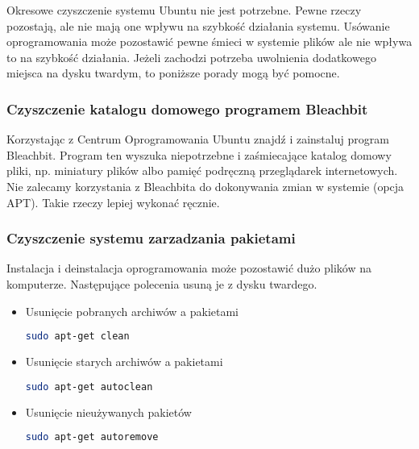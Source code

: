 Okresowe czyszczenie systemu Ubuntu nie jest potrzebne. Pewne rzeczy pozostają, ale nie mają one wpływu na szybkość działania systemu. Usówanie oprogramowania może pozostawić pewne śmieci w systemie plików ale nie wpływa to na szybkość działania. Jeżeli zachodzi potrzeba uwolnienia dodatkowego miejsca na dysku twardym, to poniższe porady mogą być pomocne.

\subsubsection{Czyszczenie katalogu domowego programem Bleachbit}
Korzystając z Centrum Oprogramowania Ubuntu znajdź i zainstaluj program \textcolor{ubuntu_orange}{Bleachbit}. Program ten wyszuka niepotrzebne i zaśmiecające katalog domowy pliki, np. miniatury plików albo pamięć podręczną przeglądarek internetowych. Nie zalecamy korzystania z Bleachbita do dokonywania zmian w systemie (opcja APT). Takie rzeczy lepiej wykonać ręcznie.

\subsubsection{Czyszczenie systemu zarzadzania pakietami}
Instalacja i deinstalacja oprogramowania może pozostawić dużo plików na komputerze. Następujące polecenia usuną je z dysku twardego.
\begin{itemize}
\item Usunięcie pobranych archiwów a pakietami
\begin{lstlisting}[language=bash]
sudo apt-get clean
\end{lstlisting}
\item Usunięcie starych archiwów a pakietami
\begin{lstlisting}[language=bash]
sudo apt-get autoclean
\end{lstlisting}
\item Usunięcie nieużywanych pakietów
\begin{lstlisting}[language=bash]
sudo apt-get autoremove
\end{lstlisting}
\end{itemize}

